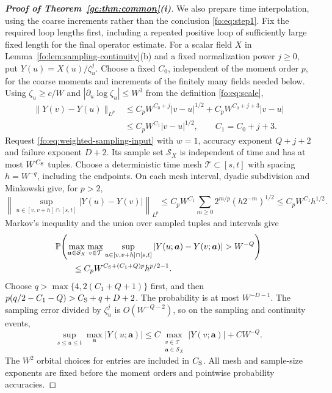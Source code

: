 \documentclass[11pt]{article}
\numberwithin{equation}{section}
\theoremstyle{remark}
\newcommand{\Prob}{\mathbb P}
\begin{document}
\begin{proof}[\textbf{Proof of Theorem~\ref{gc:thm:common}(i)}]
We also prepare time interpolation, using the coarse increments rather
than the conclusion \eqref{fo:eq:step1}. Fix the required loop lengths
first, including a repeated positive loop of sufficiently large fixed
length for the final operator estimate. For a scalar field $X$ in
Lemma~\ref{fo:lem:sampling-continuity}(b) and a fixed normalization
power $j\ge0$, put $Y(u)=X(u)/\zeta_u^j$. Choose a fixed $C_0$,
independent of the moment order $p$, for the coarse moments and increments
of the finitely many fields needed below. Using $\zeta_u\ge c/W$ and
$|\partial_u\log\zeta_u|\le W^3$ from the definition \eqref{fo:eq:scale},
\[
 \begin{aligned}
 \|Y(v)-Y(u)\|_{L^p}
 &\le C_pW^{C_0+j}|v-u|^{1/2}
       +C_pW^{C_0+j+3}|v-u|\\
 &\le C_pW^{C_1}|v-u|^{1/2},\qquad C_1=C_0+j+3.
 \end{aligned}
\]
Request \eqref{fo:eq:weighted-sampling-input} with $w=1$, accuracy
exponent $Q+j+2$ and failure exponent $D+2$. Its sample set
$\mathcal S_X$ is independent of time and has at most $W^{C_{\rm S}}$
tuples. Choose a deterministic time mesh $\mathcal T\subset[s,t]$
with spacing $h=W^{-q}$, including the endpoints. On each mesh interval,
dyadic subdivision and Minkowski give, for $p>2$,
\[
 \left\|\sup_{u\in[v,v+h]\cap[s,t]}|Y(u)-Y(v)|\right\|_{L^p}
 \le C_pW^{C_1}\sum_{m\ge0}2^{m/p}(h2^{-m})^{1/2}
 \le C_pW^{C_1}h^{1/2}.
\]
Markov's inequality and the union over sampled tuples and intervals give
\begin{equation}\label{fo:eq:time-mesh-union}
 \begin{aligned}
 &\Prob\!\left(\max_{\boldsymbol a\in\mathcal S_X}
 \max_{v\in\mathcal T}\sup_{u\in[v,v+h]\cap[s,t]}
 |Y(u;\boldsymbol a)-Y(v;\boldsymbol a)|>W^{-Q}\right)\\
 &\qquad\le C_pW^{C_{\rm S}+(C_1+Q)p}h^{p/2-1}.
 \end{aligned}
\end{equation}
Choose $q>\max\{4,2(C_1+Q+1)\}$ first, and then
$p(q/2-C_1-Q)>C_{\rm S}+q+D+2$. The probability is at most
$W^{-D-1}$. The sampling error divided by $\zeta_u^j$ is
$O(W^{-Q-2})$, so on the sampling and continuity events,
\begin{equation}\label{fo:eq:step1-time-interpolation}
 \sup_{s\le u\le t}\max_{\boldsymbol a}|Y(u;\boldsymbol a)|
 \le C\max_{\substack{v\in\mathcal T\\
                      \boldsymbol a\in\mathcal S_X}}
             |Y(v;\boldsymbol a)|+CW^{-Q}.
\end{equation}
The $W^2$ orbital choices for entries are included in $C_{\rm S}$.
All mesh and sample-size exponents are fixed before the moment orders
and pointwise probability accuracies.


\end{proof}
\end{document}
